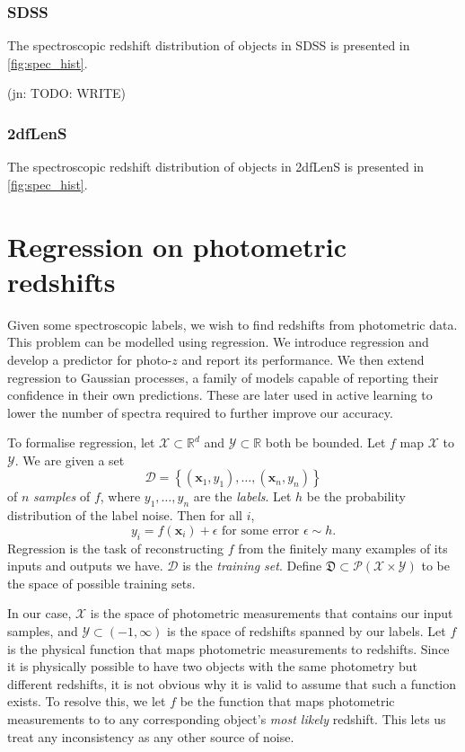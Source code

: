 \documentclass[11pt,twoside,openright]{report}
\newcommand\bbR{\mathbb{R}}
\newcommand\bx{\mathbf{x}}
\newcommand\cD{\mathcal{D}}
\newcommand\cP{\mathcal{P}}
\newcommand\cX{\mathcal{X}}
\newcommand\cY{\mathcal{Y}}
\newcommand\fD{\mathfrak{D}}
\newcommand\jn[1]{{\color{red}(jn: #1)}}
\begin{document}
  \subsection{SDSS}
  The spectroscopic redshift distribution of objects in SDSS is presented in \cref{fig:spec_hist}.

  \jn{TODO: WRITE}

  \subsection{2dfLenS}
  The spectroscopic redshift distribution of objects in 2dfLenS is presented in \cref{fig:spec_hist}.

\chapter{Regression on photometric redshifts}

Given some spectroscopic labels, we wish to find redshifts from photometric data. This problem can be modelled using regression. We introduce regression and develop a predictor for photo-$z$ and report its performance. We then extend regression to Gaussian processes, a family of models capable of reporting their confidence in their own predictions. These are later used in active learning to lower the number of spectra required to further improve our accuracy.

To formalise regression, let $\cX \subset \bbR^d$ and $\cY \subset \bbR$ both be bounded. Let $f$ map $\cX$ to $\cY$. We are given a set \[
  \cD = \left\{\left(\bx_1, y_1\right), \dots, \left(\bx_n, y_n\right)\right\}
\] of $n$ \emph{samples} of $f$, where $y_1, \dots, y_n$ are the \emph{labels}. Let $h$ be the probability distribution of the label noise. Then for all $i$, \[
  y_i = f(\bx_i) + \epsilon \text{ for some error } \epsilon \sim h \text{.}
\] Regression is the task of reconstructing $f$ from the finitely many examples of its inputs and outputs we have. $\cD$ is the \emph{training set}. Define $\fD \subset \cP(\cX \times \cY)$ to be the space of possible training sets.

In our case, $\cX$ is the space of photometric measurements that contains our input samples, and $\cY \subset (-1, \infty)$ is the space of redshifts spanned by our labels. Let $f$ is the physical function that maps photometric measurements to redshifts. Since it is physically possible to have two objects with the same photometry but different redshifts, it is not obvious why it is valid to assume that such a function exists. To resolve this, we let $f$ be the function that maps photometric measurements to to any corresponding object's \emph{most likely} redshift. This lets us treat any inconsistency as any other source of noise.
\end{document}
